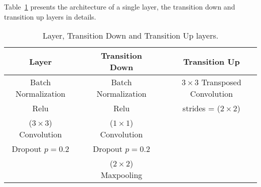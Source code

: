 Table~\ref{layers} presents the architecture of a single layer, the transition down  and transition up layers in details.
\begin{table}[h!]
	\renewcommand{\arraystretch}{1.3}
	\centering
	\scriptsize
	\resizebox{\textwidth}{!}
	{
	\begin{tabular}{ccccc}
		\hline
		Layer &  &  Transition Down &  &  Transition Up \\ 
		\hline
		Batch Normalization &  & Batch Normalization &  &  \(3\times 3\) Transposed Convolution  \\ 
		Relu &  & Relu &  & strides = (\(2\times2\))  \\ 
		(\(3\times3\)) Convolution &  & (\(1\times1\)) Convolution &  &  \\ 
		Dropout \(p=0.2\) &  &Dropout \(p=0.2\)  &  &  \\ 
		 &  & (\(2\times2\)) Maxpooling &  &  \\ 
	    \hline
	\end{tabular}
	}
	\caption{Layer, Transition Down and Transition Up layers.} 
	\label{layers}
	
\end{table}\\
